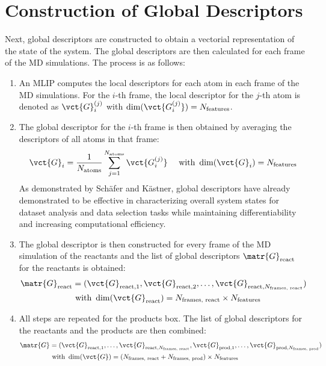 \newpage

\section{Construction of Global Descriptors}
\label{sec:global_descriptors}
Next, global descriptors are constructed to obtain a vectorial representation of the state of the system. 
The global descriptors are then calculated for each frame of the MD simulations. 
The process is as follows:

\begin{enumerate}
    \item An MLIP computes the local descriptors for each atom in each frame of the MD simulations.
    For the $i$-th frame, the local descriptor for the $j$-th atom is denoted as $\vct{G}_{i}^{(j)}$ with $\dim(\vct{G_{i}^{(j)}}) = N_{\text{features}}$.
    \item The global descriptor for the $i$-th frame is then obtained by averaging the descriptors of all atoms in that frame:
    \begin{align}
        \vct{G}_i = \frac{1}{N_{\text{atoms}}} \sum_{j=1}^{N_{\text{atoms}}} \vct{G_{i}^{(j)}} \quad \text{ with } \dim(\vct{G}_i) = N_{\text{features}}
    \end{align}
    As demonstrated by Schäfer and Kästner, global descriptors have already demonstrated to be effective in characterizing overall system states for dataset analysis and data selection tasks while maintaining differentiability and increasing computational efficiency\cite{Schaefer2025}.
    \item The global descriptor is then constructed for every frame of the MD simulation of the reactants and the list of global descriptors $\matr{G}_{\text{react}}$ for the reactants is obtained:
    \begin{align}
    \matr{G}_{\text{react}} &= ( \vct{G}_{\text{react},1}, \vct{G}_{\text{react},2}, \dots, \vct{G}_{\text{react},N_{\text{frames, react}}} )  \nonumber \\
    &\text{ with } \dim(\vct{G}_{\text{react}}) = N_{\text{frames, react}} \times N_{\text{features}} 
    \end{align}
    \item All steps are repeated for the products box. The list of global descriptors for the reactants and the products are then combined:
    \begin{align}
    \matr{G} &= ( \vct{G}_{\text{react},1}, \dots, \vct{G}_{\text{react},N_{\text{frames, react}}} , \vct{G}_{\text{prod},1}, \dots, \vct{G}_{\text{prod},N_{\text{frames, prod}}} ) \nonumber \\
    &\text{ with } \dim(\vct{G}) = (N_{\text{frames, react}} + N_{\text{frames, prod}}) \times N_{\text{features}} 
    \end{align}
\end{enumerate}

